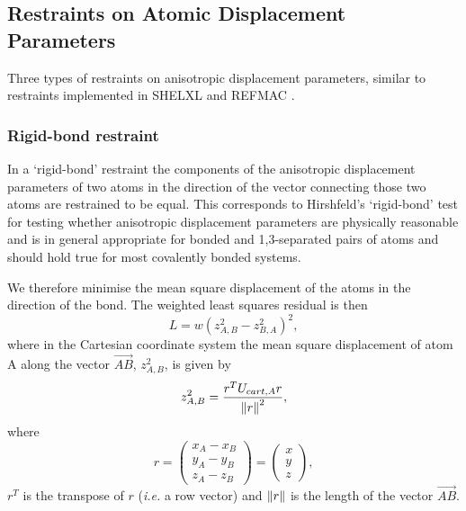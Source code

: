 \documentclass[pdf]{iucr}
\begin{document}


\subsection{Restraints on Atomic Displacement Parameters}

Three types of restraints on anisotropic displacement parameters, similar to restraints implemented in SHELXL \cite{Sheldrick:sc5010} and REFMAC \cite{Murshudov:li0304}.

\subsubsection{Rigid-bond restraint}

In a `rigid-bond' restraint the components of the anisotropic displacement parameters of two atoms in the direction of the vector connecting those two atoms are restrained to be equal. This corresponds to Hirshfeld's `rigid-bond' test \cite{Hirshfeld:a12865} for testing whether anisotropic displacement parameters are physically reasonable \cite{SHELX:man97} and is in general appropriate for bonded and 1,3-separated pairs of atoms and should hold true for most covalently bonded systems.

We therefore minimise the mean square displacement of the atoms in the direction of the bond. The weighted least squares residual is then
\begin{equation}
\label{eqn:rigid_bond}
L = w(z^2_{A,B} - z^2_{B,A})^2,
\end{equation}
where in the Cartesian coordinate system the mean square displacement of atom A
along the vector $\overrightarrow{AB}$, $z^2_{A,B}$, is given by
\begin{equation}
z^2_{A,B} = \frac{r^TU_{cart,A}r}{\left\| r \right\|^2},
\end{equation}
where
\begin{equation}
r = \begin{pmatrix} x_A - x_B\\y_A - y_B\\z_A - z_B \end{pmatrix}
= \begin{pmatrix} x\\y\\z \end{pmatrix},
\end{equation}
$r^T$ is the transpose of $r$ (\textit{i.e.} a row vector) and
$\left\| r \right\|$ is the length of the vector $\overrightarrow{AB}$.
\end{document}
